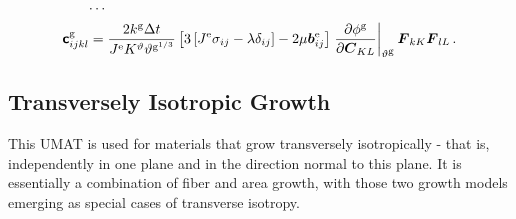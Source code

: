 \documentclass[10pt,letterpaper,oneside]{report}
\newcommand{\ten}[1]{\mbox{\boldmath $#1$}{}}
\newcommand{\tenf}[1]{\mbox{{\sffamily{\bfseries {#1}}}}}
\newcommand{\scas}[1]{\mbox{{\scriptsize{${\rm{#1}}$}}}{}}
\begin{document}
\begin{itemize}
\begin{align}
\cdots{}& \notag \\
\tenf{c}^{\scas{g}}_{ijkl} ={}& \frac{2 k^{\scas{g}} \Delta t}{J^{\scas{e}} K^\vartheta \vartheta^{\scas{g}^{1/3}}} \left[ 3 \left[ J^{\scas{e}} \sigma_{ij} - \lambda \delta_{ij} \right]
- 2 \mu \ten{b}^{\scas{e}}_{ij} \right] \left. \frac{\partial \phi^{\scas{g}} }{\partial \ten{C}_{KL}} \right|_{\vartheta^{\scas{g}}} \ten{F}_{kK} \ten{F}_{lL} \, . 
\end{align}


\subsection{Transversely Isotropic Growth}
This UMAT is used for materials that grow transversely isotropically - that is, independently in one plane and in the direction normal to this plane.  It is essentially a combination of fiber and area growth, with those two growth models emerging as special cases of transverse isotropy.    


\end{itemize}
\end{document}
